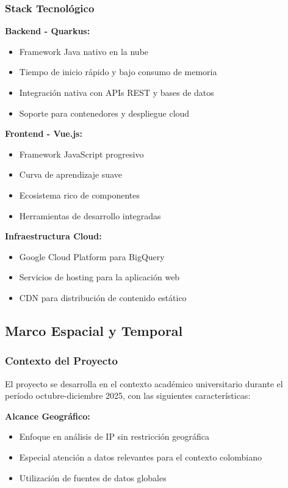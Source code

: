 \subsubsection{Stack Tecnológico}

\textbf{Backend - Quarkus:}
\begin{itemize}
    \item Framework Java nativo en la nube
    \item Tiempo de inicio rápido y bajo consumo de memoria
    \item Integración nativa con APIs REST y bases de datos
    \item Soporte para contenedores y despliegue cloud
\end{itemize}

\textbf{Frontend - Vue.js:}
\begin{itemize}
    \item Framework JavaScript progresivo
    \item Curva de aprendizaje suave
    \item Ecosistema rico de componentes
    \item Herramientas de desarrollo integradas
\end{itemize}

\textbf{Infraestructura Cloud:}
\begin{itemize}
    \item Google Cloud Platform para BigQuery
    \item Servicios de hosting para la aplicación web
    \item CDN para distribución de contenido estático
\end{itemize}

\subsection{Marco Espacial y Temporal}

\subsubsection{Contexto del Proyecto}
El proyecto se desarrolla en el contexto académico universitario durante el período octubre-diciembre 2025, con las siguientes características:

\textbf{Alcance Geográfico:}
\begin{itemize}
    \item Enfoque en análisis de IP sin restricción geográfica
    \item Especial atención a datos relevantes para el contexto colombiano
    \item Utilización de fuentes de datos globales
\end{itemize}

